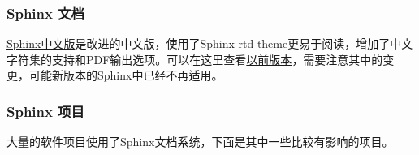 \documentclass[letterpaper,10pt,english]{sphinxmanual}
\begin{document}
\subsubsection{Sphinx 文档}
\label{jupyter/sphinx_quickstart:Sphinx-_u6587_u6863}
\href{http://sphinx-docx.readthedocs.io/en/latest/intro.html}{Sphinx中文版}是改进的中文版，使用了Sphinx-rtd-theme更易于阅读，增加了中文字符集的支持和PDF输出选项。可以在这里查看\href{http://sphinx-doc-zh.readthedocs.io/en/latest/tutorial.html}{以前版本}，需要注意其中的变更，可能新版本的Sphinx中已经不再适用。


\subsubsection{Sphinx 项目}
\label{jupyter/sphinx_quickstart:Sphinx-_u9879_u76ee}
大量的软件项目使用了Sphinx文档系统，下面是其中一些比较有影响的项目。
\end{document}
